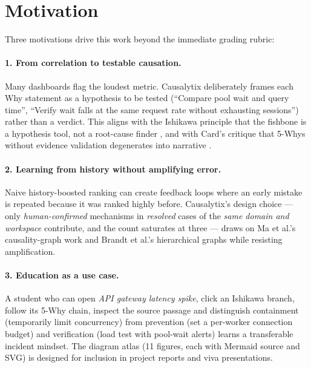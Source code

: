 \documentclass[12pt,a4paper,oneside]{report}
\begin{document}
\section{Motivation}
\label{sec:motivation}

Three motivations drive this work beyond the immediate grading rubric:

\paragraph{1. From correlation to testable causation.} Many dashboards flag the loudest metric. Causalytix deliberately frames each Why statement as a hypothesis to be tested (``Compare pool wait and query time'', ``Verify wait falls at the same request rate without exhausting sessions'') rather than a verdict. This aligns with the Ishikawa principle that the fishbone is a hypothesis tool, not a root-cause finder \cite{ciecinska2023identification,doggett2005root}, and with Card's critique that 5-Whys without evidence validation degenerates into narrative \cite{card2017problem}.

\paragraph{2. Learning from history without amplifying error.} Naive history-boosted ranking can create feedback loops where an early mistake is repeated because it was ranked highly before. Causalytix's design choice --- only \textit{human-confirmed} mechanisms in \textit{resolved} cases of the \textit{same domain and workspace} contribute, and the count saturates at three --- draws on Ma et al.'s causality-graph work \cite{ma2020automating} and Brandt et al.'s hierarchical graphs \cite{brandherm2022causeinfer} while resisting amplification.

\paragraph{3. Education as a use case.} A student who can open \textit{API gateway latency spike}, click an Ishikawa branch, follow its 5-Why chain, inspect the source passage and distinguish containment (temporarily limit concurrency) from prevention (set a per-worker connection budget) and verification (load test with pool-wait alerts) learns a transferable incident mindset. The diagram atlas (11 figures, each with Mermaid source and SVG) is designed for inclusion in project reports and viva presentations.
\end{document}

